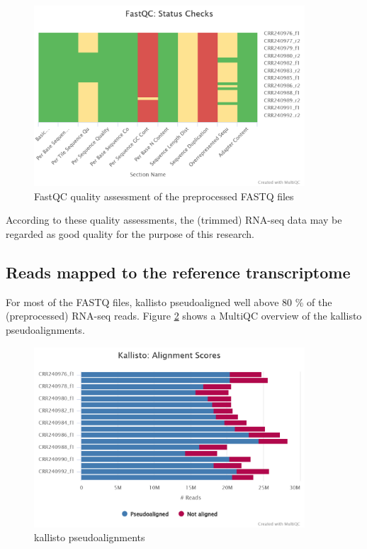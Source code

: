 \begin{figure}[htbp]
    \caption{FastQC quality assessment of the preprocessed FASTQ files}
    \label{fig:0.2-MultiQC_FastQC_status_checks}
    \includegraphics[width=0.9\textwidth]{../../results/multiqc/Plot-Exports/fastqc-status-check-heatmap}
\end{figure}

According to these quality assessments, the (trimmed) RNA-seq data may be regarded as good quality for the purpose of this research.


\subsection{Reads mapped to the reference transcriptome}

For most of the FASTQ files, kallisto pseudoaligned well above 80 \% of the (preprocessed) RNA-seq reads. Figure \ref{fig:0.3-MultiQC_kallisto_alignment} shows a MultiQC overview of the kallisto pseudoalignments.

\begin{figure}[htbp]
    \caption{kallisto pseudoalignments}
    \label{fig:0.3-MultiQC_kallisto_alignment}
    \includegraphics[width=0.9\textwidth]{../../results/multiqc/Plot-Exports/kallisto_alignment}
\end{figure}


